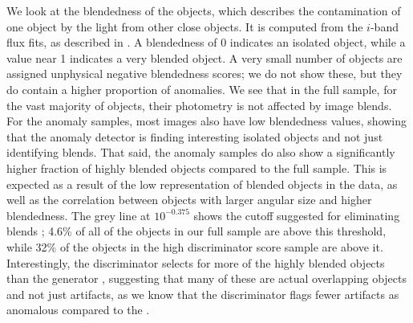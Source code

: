 We look at the blendedness of the objects, which describes the contamination of one object by the light from other close objects. 
It is computed from the $i$-band flux fits, as described in \citep{Bosch2019}.
A blendedness of 0 indicates an isolated object, while a value near 1 indicates a very blended object. 
A very small number of objects are assigned unphysical negative blendedness scores; we do not show these, but they do contain a higher proportion of anomalies.
We see that in the full sample, for the vast majority of objects, their photometry is not affected by image blends.
For the anomaly samples, most images also have low blendedness values, showing that the anomaly detector is finding interesting isolated objects and not just identifying blends.
That said, the anomaly samples do also show a significantly higher fraction of highly blended objects compared to the full sample.
This is expected as a result of the low representation of blended objects in the data, as well as the correlation between objects with larger angular size and higher blendedness.
The grey line at $10^{-0.375}$ shows the cutoff suggested for eliminating blends \citep{Mandelbaum2018}; 4.6\% of all of the objects in our full sample are above this threshold, while 32\% of the objects in the high discriminator score sample are above it.
Interestingly, the discriminator selects for more of the highly blended objects than the generator , suggesting that many of these are actual overlapping objects and not just artifacts, as we know that the discriminator flags fewer artifacts as anomalous compared to the .

